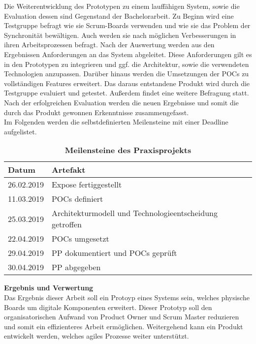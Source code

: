 \documentclass[12pt,titlepage]{scrartcl}
\begin{document}
Die Weiterentwicklung des Prototypen zu einem lauffähigen System, sowie die Evaluation dessen sind Gegenstand der Bachelorarbeit. Zu Beginn wird eine Testgruppe befragt wie sie Scrum-Boards verwenden und wie sie das Problem der Synchronität bewältigen. Auch werden sie nach möglichen Verbesserungen in ihren Arbeitsprozessen befragt. Nach der Auswertung werden aus den Ergebnissen Anforderungen an das System abgeleitet. Diese Anforderungen gilt es in den Prototypen zu integrieren und ggf. die Architektur, sowie die verwendeten Technologien anzupassen. Darüber hinaus werden die Umsetzungen der POCs zu vollständigen Features erweitert. Das daraus entstandene Produkt wird durch die Testgruppe evaluiert und getestet. Außerdem findet eine weitere Befragung statt. Nach der erfolgreichen Evaluation werden die neuen Ergebnisse und somit die durch das Produkt gewonnen Erkenntnisse zusammengefasst.
\\
Im Folgenden werden die selbstdefinierten Meilensteine mit einer Deadline aufgelistet.
\begin{table}[H]
\centering
\caption{\textbf{Meilensteine des Praxisprojekts}}
\begin{tabular}{|c|l|}
\hline
\multicolumn{1}{|l|}{\textbf{Datum}} & {\textbf{Artefakt}} \\ \hline
26.02.2019                                 & Expose fertiggestellt \\ \hline
11.03.2019                                 & POCs definiert\\ \hline
25.03.2019                                       & Architekturmodell und Technologieentscheidung getroffen \\ \hline
22.04.2019                                       & POCs umgesetzt                                  \\ \hline
29.04.2019                                       & PP dokumentiert und POCs geprüft                                \\ \hline
30.04.2019                                       & PP abgegeben\\ \hline
\end{tabular}
\end{table}
\newpage
\noindent \textbf{Ergebnis und Verwertung} \\
Das Ergebnis dieser Arbeit soll ein Protoyp eines Systems sein, welches physische Boards um digitale Komponenten erweitert. Dieser Prototyp soll den organisatorischen Aufwand von Product Owner und Scrum Master reduzieren und somit ein effizienteres Arbeit ermöglichen. Weitergehend kann ein Produkt entwickelt werden, welches agiles Prozesse weiter unterstützt. 
\end{document}

